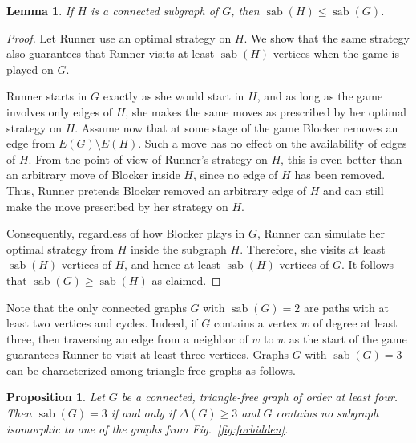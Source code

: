 \documentclass[10pt,a4paper]{amsart}
\newtheorem{lemma}[theorem]{Lemma}
\newtheorem{proposition}[theorem]{Proposition}
\DeclareMathOperator{\sab}{\mathrm{sab}}
\begin{document}
\begin{lemma}\label{lem:subgraph}
If $H$ is a connected subgraph of $G$, then $\sab(H)\le \sab(G)$.
\end{lemma}

\begin{proof}
Let Runner use an optimal strategy on $H$. We show that the same strategy also guarantees that Runner visits at least $\sab(H)$ vertices when the game is played on $G$.

Runner starts in $G$ exactly as she would start in $H$, and as long as the game involves only edges of $H$, she makes the same moves as prescribed by her optimal strategy on $H$. Assume now that at some stage of the game Blocker removes an edge from $E(G)\setminus E(H)$. Such a move has no effect on the availability of edges of $H$. From the point of view of Runner's strategy on $H$, this is even better than an arbitrary move of Blocker inside $H$, since no edge of $H$ has been removed. Thus, Runner pretends Blocker removed an arbitrary edge of $H$ and can still make the move prescribed by her strategy on $H$.

Consequently, regardless of how Blocker plays in $G$, Runner can simulate her optimal strategy from $H$ inside the subgraph $H$. Therefore, she visits at least $\sab(H)$ vertices of $H$, and hence at least $\sab(H)$ vertices of $G$. It follows that $\sab(G)\ge \sab(H)$ as claimed.    
\end{proof}

Note that the only connected graphs $G$ with $\sab(G) = 2$ are paths with at least two vertices and cycles. Indeed, if $G$ contains a vertex $w$ of degree at least three, then traversing an edge from a neighbor of $w$ to $w$ as the start of the game guarantees Runner to visit at least three vertices.  Graphs $G$ with $\sab(G) = 3$ can be characterized among triangle-free graphs as follows. 

\begin{proposition}
\label{prp:delta=3-triangle-free}
Let $G$ be a connected, triangle-free graph of order at least four. Then $\sab(G) = 3$ if and only if $\Delta(G) \ge 3$ and $G$ contains no subgraph isomorphic to one of the graphs from Fig.~\ref{fig:forbidden}.  
\end{proposition}
\end{document}

